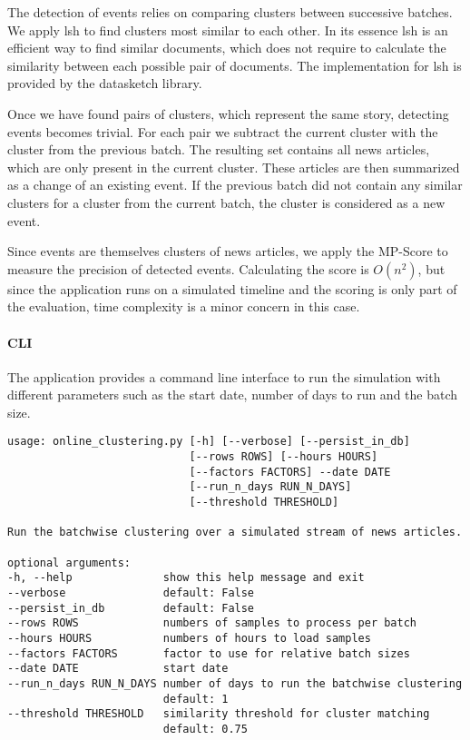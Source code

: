 The detection of events relies on comparing clusters between successive batches. 
We apply \gls{lsh}\cite{alex2015practical} to find clusters most similar to each other.
In its essence \gls{lsh} is an efficient way to find similar documents, 
which does not require to calculate the similarity between each possible pair of documents. 
The implementation for \gls{lsh} is provided by the datasketch library\cite{eric_zhu_2017_290602}.

Once we have found pairs of clusters, which represent the same story, detecting events becomes trivial.
For each pair we subtract the current cluster with the cluster from the previous batch. 
The resulting set contains all news articles, which are only present in the current cluster.
These articles are then summarized as a change of an existing event. 
If the previous batch did not contain any similar clusters for a cluster from the current batch, 
the cluster is considered as a new event.

Since events are themselves clusters of news articles,
we apply the MP-Score to measure the precision of detected events. 
Calculating the score is $O(n^2)$, but since the application runs on a simulated timeline and the scoring is only part of the evaluation,
time complexity is a minor concern in this case.

\paragraph{CLI}
The application provides a command line interface to run the simulation with different parameters
such as the start date, number of days to run and the batch size.

\begin{lstlisting}[caption=Command line interface for the online clustering., label={lst:cli_online_clustering}]
usage: online_clustering.py [-h] [--verbose] [--persist_in_db] 
                            [--rows ROWS] [--hours HOURS] 
                            [--factors FACTORS] --date DATE
                            [--run_n_days RUN_N_DAYS] 
                            [--threshold THRESHOLD]

Run the batchwise clustering over a simulated stream of news articles.

optional arguments:
-h, --help              show this help message and exit
--verbose               default: False
--persist_in_db         default: False
--rows ROWS             numbers of samples to process per batch
--hours HOURS           numbers of hours to load samples
--factors FACTORS       factor to use for relative batch sizes
--date DATE             start date
--run_n_days RUN_N_DAYS number of days to run the batchwise clustering
                        default: 1
--threshold THRESHOLD   similarity threshold for cluster matching
                        default: 0.75

\end{lstlisting}
